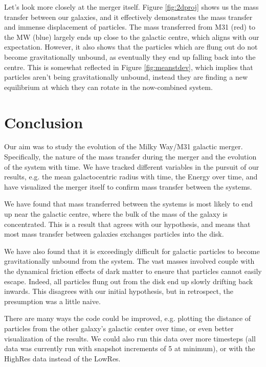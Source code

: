 \documentclass[linenumbers]{aastex631} %
\begin{document}
Let's look more closely at the merger itself. Figure \ref{fig:2dproj}
shows us the mass transfer between our galaxies, and it effectively demonstrates the mass transfer and immense displacement of particles. The mass transferred from M31 (red) to the MW (blue) largely ends up close to the galactic centre, which aligns with our expectation. However, it also shows that the particles which are flung out do not become gravitationally unbound, as eventually they end up falling back into the centre. This is somewhat reflected in Figure \ref{fig:meanstdev}, which implies that particles aren't being gravitationally unbound, instead they are finding a new equilibrium at which they can rotate in the now-combined system.


\section{Conclusion}

Our aim was to study the evolution of the Milky Way/M31 galactic merger. Specifically, the nature of the mass transfer during the merger and the evolution of the system with time. We have tracked different variables in the pursuit of our results, e.g. the mean galactocentric radius with time, the Energy over time, and have visualized the merger itself to confirm mass transfer between the systems.

We have found that mass transferred between the systems is most likely to end up near the galactic centre, where the bulk of the mass of the galaxy is concentrated. This is a result that agrees with our hypothesis, and means that most mass transfer between galaxies exchanges particles into the disk.

We have also found that it is exceedingly difficult for galactic particles to become gravitationally unbound from the system. The vast masses involved couple with the dynamical friction effects of dark matter to ensure that particles cannot easily escape. Indeed, all particles flung out from the disk end up slowly drifting back inwards. This disagrees with our initial hypothesis, but in retrospect, the presumption was a little naive. 


There are many ways the code could be improved, e.g. plotting the distance of particles from the other galaxy's galactic center over time, or even better visualization of the results. We could also run this data over more timesteps (all data was currently run with snapshot increments of 5 at minimum), or with the HighRes data instead of the LowRes.
\end{document}
